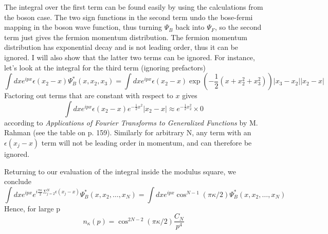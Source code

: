 \documentclass[onecolumn,english,aps,pra]{revtex4}
\begin{document}
%
The integral over the first term can be found easily by using the calculations from the boson case. The two sign functions in the second term undo the bose-fermi mapping in the boson wave function, thus turning $\Psi_{B}$ back into $\Psi_{F}$, so the second term just gives the fermion momentum distribution. The fermion momentum distribution has exponential decay and is not leading order, thus it can be ignored. I will also show that the latter two terms can be ignored. For instance, let's look at the integral for the third term (ignoring prefactors)
%
\[
\int dx e^{ipx} \epsilon(x_{2} - x) \Psi_{B}^*(x, x_{2},x_{3}) = \int dx e^{ipx} \epsilon(x_{2} - x)\exp\left(-\frac{1}{2}( x + x_{2}^2 + x_{3}^2)\right) |x_{3} - x_{2}| |x_{2} - x|
\]
Factoring out terms that are constant with respect to $x$ gives
\[
\int dx e^{ipx} \epsilon(x_{2} - x) e^{-\frac{1}{2} x^2 } |x_{2} - x| \approx e^{-\frac{1}{2} x_{2}^2} \times 0
\]
according to \textit{Applications of Fourier Transforms to Generalized Functions} by M. Rahman (see the table on p. 159). Similarly for arbitrary N, any term with an $\epsilon(x_{j}- x)$ term will not be leading order in momentum, and can therefore be ignored.

Returning to our evaluation of the integral inside the modulus square, we conclude
\[
\int dx e^{ipx} e^{i\frac{\pi \kappa}{2} \Sigma_{j=2}^N \epsilon(x_{j} - x)} \Psi_{B}^*(x, x_{2}, \ldots, x_{N}) 
= \int dx e^{ipx} \cos^{N-1}(\pi \kappa/2) \Psi_{B}^*(x, x_{2}, \ldots, x_{N}) 
\]
Hence, for large p
\[
n_{\kappa}(p) = \cos^{2N - 2}(\pi \kappa/2) \dfrac{C_{N}}{p^4}
\]
	
\end{document}
